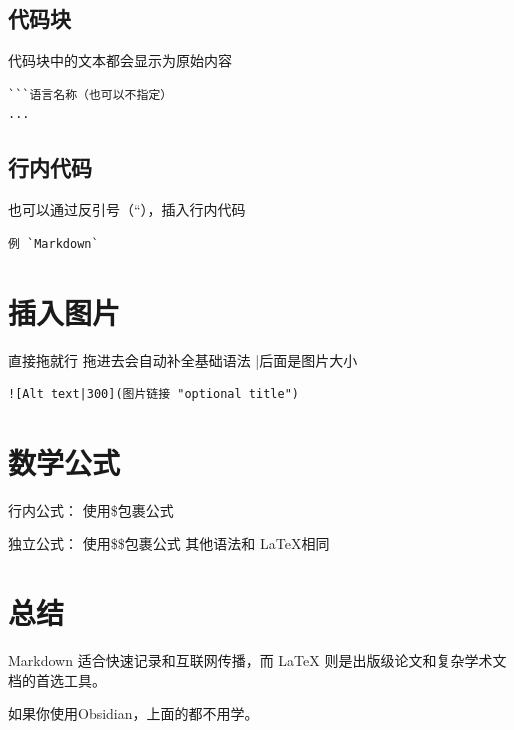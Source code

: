\documentclass[10pt,a4paper]{book}
\theoremstyle{thmstyle} %
\theoremstyle{defstyle} %
\theoremstyle{prostyle} %
\begin{document}
	\subsection{代码块}
	代码块中的文本都会显示为原始内容
	\begin{lstlisting}
```语言名称（也可以不指定）
...
	\end{lstlisting}
	\subsection{行内代码}
	也可以通过反引号（``），插入行内代码
	
	\begin{lstlisting}
例 `Markdown`
	\end{lstlisting}
	
	\section{插入图片}
	直接拖就行
	拖进去会自动补全基础语法
	|后面是图片大小
	\begin{lstlisting}
![Alt text|300](图片链接 "optional title")
	\end{lstlisting}
	
	\section{数学公式}
	行内公式： 使用\$包裹公式
	
	独立公式： 使用\$\$包裹公式
	其他语法和 \LaTeX 相同
	\section{总结}
	Markdown 适合快速记录和互联网传播，而 \LaTeX{} 则是出版级论文和复杂学术文档的首选工具。
	
	\begin{mybox}
		
		\Huge 如果你使用Obsidian，上面的都不用学。
		
	\end{mybox}
\end{document}
